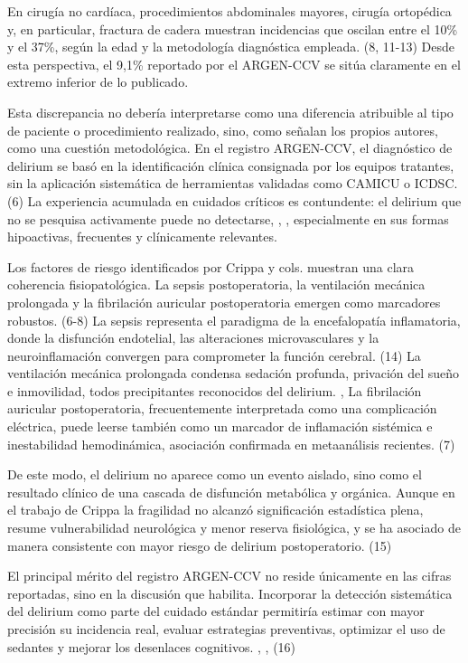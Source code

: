 En cirugía no cardíaca, procedimientos abdominales mayores, cirugía ortopédica y, en particular, fractura de cadera muestran incidencias que oscilan entre el 10\% y el 37\%, según la edad y la metodología diagnóstica empleada. (8, 11-13) Desde esta perspectiva, el 9,1\% reportado por el ARGEN-CCV se sitúa claramente en el extremo inferior de lo publicado.

Esta discrepancia no debería interpretarse como una diferencia atribuible al tipo de paciente o procedimiento realizado, sino, como señalan los propios autores, como una cuestión metodológica. En el registro ARGEN-CCV, el diagnóstico de delirium se basó en la identificación clínica consignada por los equipos tratantes, sin la aplicación sistemática de herramientas validadas como CAMICU o ICDSC. (6) La experiencia acumulada en cuidados críticos es contundente: el delirium que no se pesquisa activamente puede no detectarse, \cite{1262-ELY2004}, \cite{1298-INOUYE2014}, \cite{1299-WILSON2020} especialmente en sus formas hipoactivas, frecuentes y clínicamente relevantes.

Los factores de riesgo identificados por Crippa y cols. muestran una clara coherencia fisiopatológica. La sepsis postoperatoria, la ventilación mecánica prolongada y la fibrilación auricular postoperatoria emergen como marcadores robustos. (6-8) La sepsis representa el paradigma de la encefalopatía inflamatoria, donde la disfunción endotelial, las alteraciones microvasculares y la neuroinflamación convergen para comprometer la función cerebral. (14) La ventilación mecánica prolongada condensa sedación profunda, privación del sueño e inmovilidad, todos precipitantes reconocidos del delirium. \cite{1262-ELY2004}, \cite{1298-INOUYE2014} La fibrilación auricular postoperatoria, frecuentemente interpretada como una complicación eléctrica, puede leerse también como un marcador de inflamación sistémica e inestabilidad hemodinámica, asociación confirmada en metaanálisis recientes. (7)

De este modo, el delirium no aparece como un evento aislado, sino como el resultado clínico de una cascada de disfunción metabólica y orgánica. Aunque en el trabajo de Crippa la fragilidad no alcanzó significación estadística plena, resume vulnerabilidad neurológica y menor reserva fisiológica, y se ha asociado de manera consistente con mayor riesgo de delirium postoperatorio. (15)

El principal mérito del registro ARGEN-CCV no reside únicamente en las cifras reportadas, sino en la discusión que habilita. Incorporar la detección sistemática del delirium como parte del cuidado estándar permitiría estimar con mayor precisión su incidencia real, evaluar estrategias preventivas, optimizar el uso de sedantes y mejorar los desenlaces cognitivos. \cite{1262-ELY2004}, \cite{1298-INOUYE2014}, \cite{1299-WILSON2020} (16)

